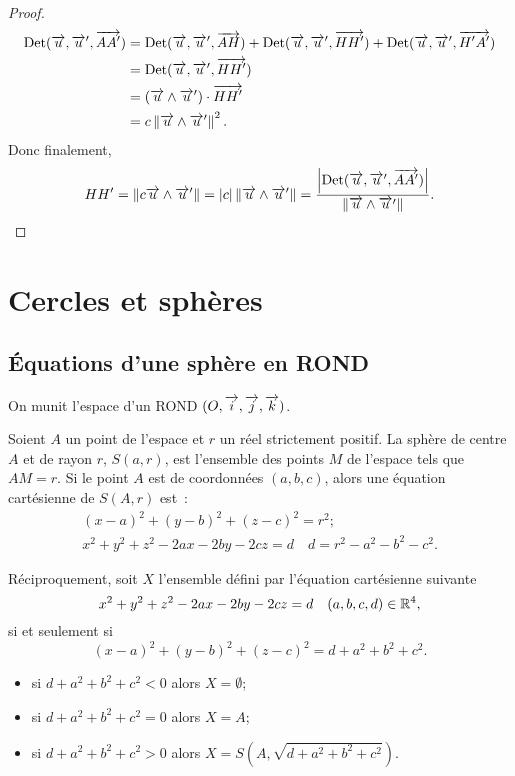 \begin{proof}
  \begin{align}
    \operatorname{Det}(\overrightarrow{u},\overrightarrow{u}',\overrightarrow{AA'})&=\operatorname{Det}(\overrightarrow{u},\overrightarrow{u}',\overrightarrow{AH})+\operatorname{Det}(\overrightarrow{u},\overrightarrow{u}',\overrightarrow{HH'})+\operatorname{Det}(\overrightarrow{u},\overrightarrow{u}',\overrightarrow{H'A'})\\
    &=\operatorname{Det}(\overrightarrow{u},\overrightarrow{u}',\overrightarrow{HH'})\\
    &=(\overrightarrow{u}\wedge\overrightarrow{u}')\cdot\overrightarrow{HH'}\\
    &=c\left\lVert\overrightarrow{u}\wedge\overrightarrow{u}'\right\rVert^2.
  \end{align}
  Donc finalement, 
  \begin{equation}
    HH'=\left\lVert c\overrightarrow{u}\wedge\overrightarrow{u}'\right\rVert=\left\lvert c\right\rvert\left\lVert\overrightarrow{u}\wedge\overrightarrow{u}'\right\rVert=\frac{\left\lvert\operatorname{Det}(\overrightarrow{u},\overrightarrow{u}',\overrightarrow{AA'})\right\rvert}{\left\lVert\overrightarrow{u}\wedge\overrightarrow{u}'\right\rVert}.
  \end{equation}
\end{proof}

\section{Cercles et sphères}

\subsection{Équations d'une sphère en ROND}

On munit l'espace d'un ROND \((O,\overrightarrow{i},\overrightarrow{j},\overrightarrow{k})\).
\begin{defdef}
  Soient \(A\) un point de l'espace et \(r\) un réel strictement positif. La sphère de centre \(A\) et de rayon \(r\), \(S(a,r)\), est l'ensemble des points \(M\) de l'espace tels que \(AM=r\). Si le point \(A\) est de coordonnées \((a,b,c)\), alors une équation cartésienne de \(S(A,r)\) est~:
  \begin{gather}
    (x-a)^2+(y-b)^2+(z-c)^2=r^2; \\
    x^2+y^2+z^2-2ax-2by-2cz=d \quad d=r^2-a^2-b^2-c^2.
  \end{gather}
\end{defdef}
Réciproquement, soit \(X\) l'ensemble défini par l'équation cartésienne suivante
\begin{equation}
  x^2+y^2+z^2-2ax-2by-2cz=d \quad (a,b,c,d)\in \mathbb{R}^4,
\end{equation}
si et seulement si
\begin{equation}
  (x-a)^2+(y-b)^2+(z-c)^2=d+a^2+b^2+c^2.
\end{equation}
\begin{itemize}
\item si \(d+a^2+b^2+c^2<0\) alors \(X=\emptyset\);
\item si \(d+a^2+b^2+c^2=0\) alors \(X=A\);
\item si \(d+a^2+b^2+c^2>0\) alors \(X=S(A,\sqrt{d+a^2+b^2+c^2})\).
\end{itemize}

